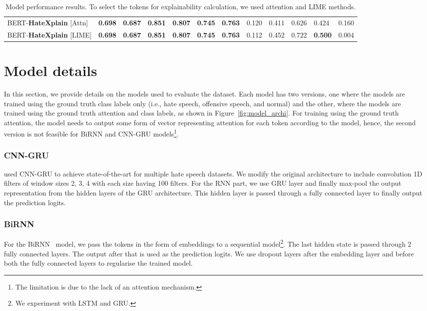 \documentclass[letterpaper]{article} \usepackage{aaai21}  \usepackage{times}  \usepackage{helvet} \usepackage{courier}  \usepackage[hyphens]{url}  \usepackage{graphicx} \urlstyle{rm} \def\UrlFont{\rm}  \usepackage{natbib}  \usepackage{caption}
\begin{document}
\begin{table*}[htb!]
{\begin{tabular}{l| lll | lll | lll|ll}
BERT-{\bf{HateXplain}} [Attn]&\textbf{0.698}        &\textbf{0.687}     &\textbf{0.851}  &\textbf{0.807}     &\textbf{0.745}     &\textbf{0.763}     &0.120             &0.411              &0.626          &0.424          &0.160   \\
BERT-{\bf{HateXplain}} [LIME]&\textbf{0.698}        &\textbf{0.687}     &\textbf{0.851}  &\textbf{0.807}     &\textbf{0.745}     &\textbf{0.763}     &0.112             &0.452              &0.722          &\textbf{0.500} &0.004   \\
\hline
\end{tabular}}\caption{Model performance results. To select the tokens for explainability calculation, we used attention and LIME methods.}
\label{tab:results}
\end{table*}






\section{Model details}
\label{modeldetails}
In this section, we provide details on the models used to evaluate the dataset. Each model has two versions, one where the models are trained using the ground truth class labels only (i.e., hate speech, offensive speech, and normal) and the other, where the models are trained using the ground truth attention and class labels, as shown in Figure~\ref{fig:model_archi}. For training using the ground truth attention, the model needs to output some form of vector representing attention for each token according to the model, hence, the second version is not feasible for BiRNN and CNN-GRU models\footnote{The limitation is due to the lack of an attention mechanism.}.


\subsubsection{CNN-GRU}
\citet{zhang2018detecting} used CNN-GRU to achieve state-of-the-art for multiple hate speech datasets. We modify the original architecture to include convolution 1D filters of window sizes 2, 3, 4 with each size having 100 filters. For the RNN part, we use GRU layer and finally max-pool the output representation from the hidden layers of the GRU architecture. This hidden layer is passed through a fully connected layer to finally output the prediction logits. 


\subsubsection{BiRNN} For the BiRNN~\cite{schuster1997bidirectional} model, we pass the tokens in the form of embeddings to a sequential model\footnote{We experiment with LSTM and GRU.}. The last hidden state is passed through 2 fully connected layers. The output after that is used as the prediction logits. We use  dropout layers after the embedding layer and before both the fully connected layers to regularise the trained model. 
\end{document}
